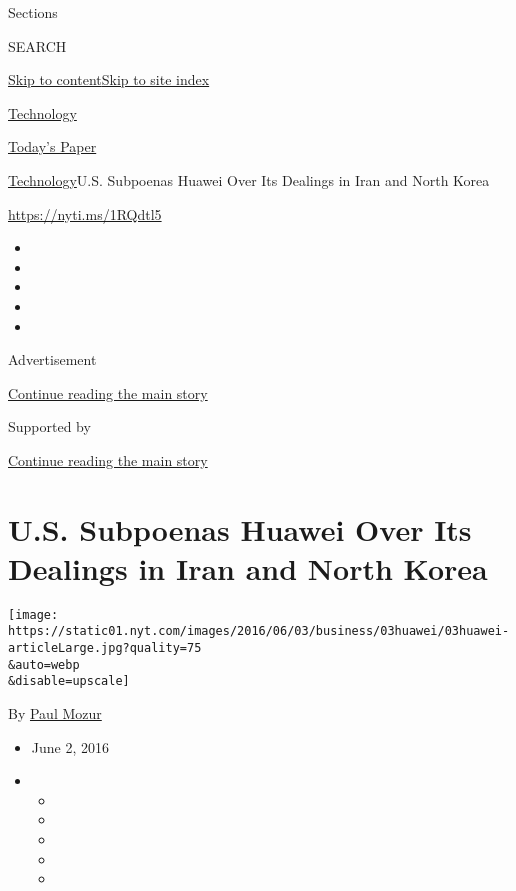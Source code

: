 Sections

SEARCH

\protect\hyperlink{site-content}{Skip to
content}\protect\hyperlink{site-index}{Skip to site index}

\href{https://www.nytimes.com/section/technology}{Technology}

\href{https://myaccount.nytimes.com/auth/login?response_type=cookie\&client_id=vi}{}

\href{https://www.nytimes.com/section/todayspaper}{Today's Paper}

\href{/section/technology}{Technology}\textbar{}U.S. Subpoenas Huawei
Over Its Dealings in Iran and North Korea

\url{https://nyti.ms/1RQdtl5}

\begin{itemize}
\item
\item
\item
\item
\item
\end{itemize}

Advertisement

\protect\hyperlink{after-top}{Continue reading the main story}

Supported by

\protect\hyperlink{after-sponsor}{Continue reading the main story}

\hypertarget{us-subpoenas-huawei-over-its-dealings-in-iran-and-north-korea}{%
\section{U.S. Subpoenas Huawei Over Its Dealings in Iran and North
Korea}\label{us-subpoenas-huawei-over-its-dealings-in-iran-and-north-korea}}

\texttt{[image: https://static01.nyt.com/images/2016/06/03/business/03huawei/03huawei-articleLarge.jpg?quality=75\\\&auto=webp\\\&disable=upscale]}

By \href{https://www.nytimes.com/by/paul-mozur}{Paul Mozur}

\begin{itemize}
\item
  June 2, 2016
\item
  \begin{itemize}
  \item
  \item
  \item
  \item
  \item
  \end{itemize}
\end{itemize}

